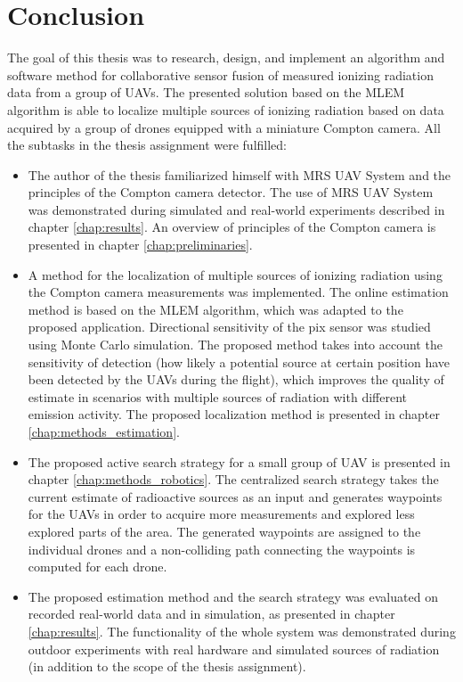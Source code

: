 \chapter{Conclusion\label{chap:conclusion}}
The goal of this thesis was to research, design, and implement an algorithm and software method for collaborative sensor fusion of
measured ionizing radiation data from a group of \ac{UAV}s.
The presented solution based on the \ac{MLEM} algorithm is able to localize multiple sources of ionizing radiation based on data acquired by a group of drones equipped with a miniature Compton camera. All the subtasks in the thesis assignment were fulfilled:
\begin{itemize}
  \item The author of the thesis familiarized himself with MRS UAV System and the principles of the Compton camera detector. 
The use of MRS UAV System was demonstrated during simulated and real-world experiments described in chapter \ref{chap:results}. 
An overview of principles of the Compton camera is presented in chapter \ref{chap:preliminaries}.
  \item A method for the localization of multiple sources of ionizing radiation using the Compton camera measurements was implemented. 
The online estimation method is based on the \ac{MLEM} algorithm, which was adapted to the proposed application.
Directional sensitivity of the \ac{pix} sensor was studied using Monte Carlo simulation.
    The proposed method takes into account the sensitivity of detection (how likely a potential source at certain position have been detected by the \ac{UAV}s during the flight), which improves the quality of estimate in scenarios with multiple sources of radiation with different emission activity.
The proposed localization method is presented in chapter \ref{chap:methods_estimation}.
  \item The proposed active search strategy for a small group of \ac{UAV} is presented in chapter \ref{chap:methods_robotics}.
    The centralized search strategy takes the current estimate of radioactive sources as an input and generates waypoints for the \ac{UAV}s in order to acquire more measurements and explored less explored parts of the area.         
    The generated waypoints are assigned to the individual drones and a non-colliding path connecting the waypoints is computed for each drone.
  \item The proposed estimation method and the search strategy was evaluated on recorded real-world data and in simulation, as presented in chapter \ref{chap:results}.
    The functionality of the whole system was demonstrated during outdoor experiments with real hardware and simulated sources of radiation 
    (in addition to the scope of the thesis assignment). 
\end{itemize}


